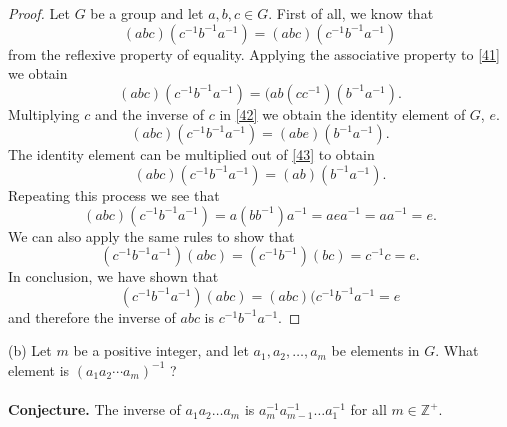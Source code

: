 \documentclass[11pt,a4paper]{article}
\begin{document}
\begin{proof}
Let $G$ be a group and let $a, b, c \in G$. First of all, we know that
\begin{equation}\label{41}
(abc)(c^{-1}b^{-1}a^{-1}) = (abc)(c^{-1}b^{-1}a^{-1})
\end{equation}
from the reflexive property of equality.
Applying the associative property to \eqref{41} we obtain
\begin{equation}\label{42}
(abc)(c^{-1}b^{-1}a^{-1}) = (ab(cc^{-1})(b^{-1}a^{-1}).
\end{equation}
Multiplying $c$ and the inverse of $c$ in \eqref{42} we obtain the identity element of $G$, $e$.
\begin{equation}\label{43}
(abc)(c^{-1}b^{-1}a^{-1}) = (abe)(b^{-1}a^{-1}).
\end{equation}
The identity element can be multiplied out of \eqref{43} to obtain
\begin{equation}
(abc)(c^{-1}b^{-1}a^{-1}) = (ab)(b^{-1}a^{-1}).
\end{equation}
Repeating this process we see that
\[(abc)(c^{-1}b^{-1}a^{-1}) = a(bb^{-1})a^{-1} = aea^{-1} = aa^{-1} = e.\]
We can also apply the same rules to show that 
\[(c^{-1}b^{-1}a^{-1})(abc) = (c^{-1}b^{-1})(bc) = c^{-1}c = e.\]
In conclusion, we have shown that 
\[(c^{-1}b^{-1}a^{-1})(abc) = (abc)(c^{-1}b^{-1}a^{-1} = e\]
and therefore the inverse of $abc$ is $c^{-1}b^{-1}a^{-1}$.
\end{proof}

(b) Let $m$ be a positive integer, and let $a_1, a_2 ,\ldots, a_m$ be elements in $G$.
What element is $(a_1 a_2 \cdots a_m )^{-1}$ ?\\
~\\
{\bf Conjecture.} The inverse of $a_1 a_2 \ldots a_m$ is $a_m^{-1}a_{m-1}^{-1}\ldots a_1^{-1}$ for all $m\in\mathbb{Z^+}$.
\end{document}
